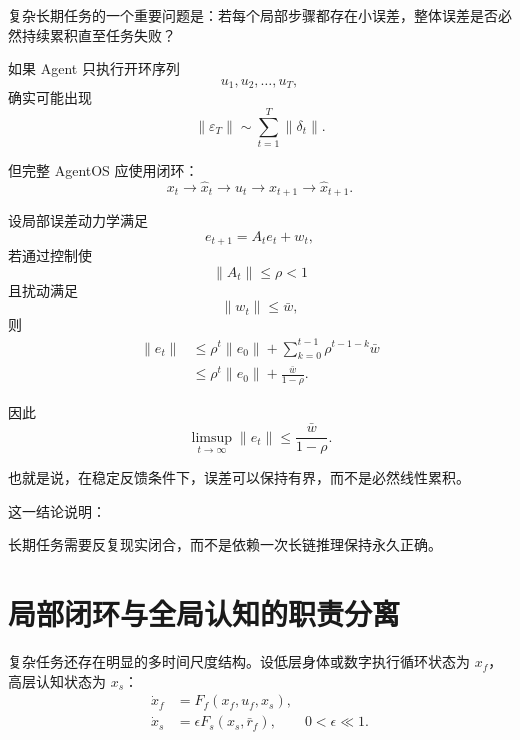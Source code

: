 复杂长期任务的一个重要问题是：若每个局部步骤都存在小误差，整体误差是否必然持续累积直至任务失败？

如果 Agent 只执行开环序列
\begin{equation}
u_1,u_2,\ldots,u_T,
\end{equation}
确实可能出现
\begin{equation}
\|\varepsilon_T\|
\sim
\sum_{t=1}^{T}
\|\delta_t\|.
\end{equation}

但完整 AgentOS 应使用闭环：
\begin{equation}
x_t
\rightarrow
\hat x_t
\rightarrow
u_t
\rightarrow
x_{t+1}
\rightarrow
\hat x_{t+1}.
\end{equation}

设局部误差动力学满足
\begin{equation}
e_{t+1}
=
A_te_t+w_t,
\end{equation}
若通过控制使
\begin{equation}
\|A_t\|
\leq
\rho<1
\end{equation}
且扰动满足
\begin{equation}
\|w_t\|
\leq
\bar w,
\end{equation}
则
\begin{align}
\|e_t\|
&\leq
\rho^t\|e_0\|
+
\sum_{k=0}^{t-1}
\rho^{t-1-k}\bar w\\
&\leq
\rho^t\|e_0\|
+
\frac{\bar w}{1-\rho}.
\end{align}

因此
\begin{equation}
\limsup_{t\rightarrow\infty}
\|e_t\|
\leq
\frac{\bar w}{1-\rho}.
\end{equation}

也就是说，在稳定反馈条件下，误差可以保持有界，而不是必然线性累积。

这一结论说明：

\begin{statementbox}
长期任务需要反复现实闭合，而不是依赖一次长链推理保持永久正确。
\end{statementbox}

\section{局部闭环与全局认知的职责分离}

复杂任务还存在明显的多时间尺度结构。设低层身体或数字执行循环状态为 $x_f$，高层认知状态为 $x_s$：
\begin{align}
\dot x_f
&=
F_f(x_f,u_f,x_s),\\
\dot x_s
&=
\epsilon F_s(x_s,\bar r_f),
\qquad
0<\epsilon\ll 1.
\end{align}

